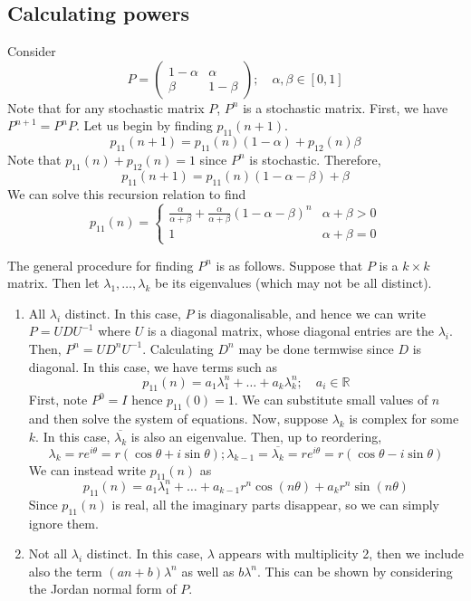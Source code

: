 \subsection{Calculating powers}
\begin{example}
	Consider
	\[
		P = \begin{pmatrix}
			1-\alpha & \alpha \\ \beta & 1-\beta
		\end{pmatrix};\quad \alpha, \beta \in [0,1]
	\]
	Note that for any stochastic matrix \( P \), \( P^n \) is a stochastic matrix.
	First, we have \( P^{n+1} = P^n P \).
	Let us begin by finding \( p_{11}(n+1) \).
	\[
		p_{11}(n+1) = p_{11}(n)(1-\alpha) + p_{12}(n)\beta
	\]
	Note that \( p_{11}(n) + p_{12}(n) = 1 \) since \( P^n \) is stochastic.
	Therefore,
	\[
		p_{11}(n+1) = p_{11}(n)(1-\alpha-\beta) + \beta
	\]
	We can solve this recursion relation to find
	\[
		p_{11}(n) = \begin{cases}
			\frac{\alpha}{\alpha + \beta} + \frac{\alpha}{\alpha + \beta}(1-\alpha-\beta)^n & \alpha + \beta > 0 \\
			1                                                                               & \alpha + \beta = 0\end{cases}
	\]
\end{example}
\noindent The general procedure for finding \( P^n \) is as follows.
Suppose that \( P \) is a \( k \times k \) matrix.
Then let \( \lambda_1, \dots, \lambda_k \) be its eigenvalues (which may not be all distinct).
\begin{enumerate}[(1)]
	\item All \( \lambda_i \) distinct.
	      In this case, \( P \) is diagonalisable, and hence we can write \( P = U D U^{-1} \) where \( U \) is a diagonal matrix, whose diagonal entries are the \( \lambda_i \).
	      Then, \( P^n = U D^n U^{-1} \).
	      Calculating \( D^n \) may be done termwise since \( D \) is diagonal.
	      In this case, we have terms such as
	      \[
		      p_{11}(n) = a_1 \lambda_1^n + \dots + a_k \lambda_k^n; \quad a_i \in \mathbb R
	      \]
	      First, note \( P^0 = I \) hence \( p_{11}(0) = 1 \).
	      We can substitute small values of \( n \) and then solve the system of equations.
	      Now, suppose \( \lambda_k \) is complex for some \( k \).
	      In this case, \( \overline{\lambda_k} \) is also an eigenvalue.
	      Then, up to reordering,
	      \[
		      \lambda_k = re^{i\theta} = r(\cos \theta + i \sin \theta); \lambda_{k-1} = \overline{\lambda_k} = re^{i\theta} = r(\cos \theta - i \sin \theta)
	      \]
	      We can instead write \( p_{11}(n) \) as
	      \[
		      p_{11}(n) = a_1 \lambda_1^n + \dots + a_{k-1} r^n \cos (n\theta) + a_k r^n \sin (n\theta)
	      \]
	      Since \( p_{11}(n) \) is real, all the imaginary parts disappear, so we can simply ignore them.
	\item Not all \( \lambda_i \) distinct.
	      In this case, \( \lambda \) appears with multiplicity 2, then we include also the term \( (an + b) \lambda^n \) as well as \( b \lambda^n \).
	      This can be shown by considering the Jordan normal form of \( P \).
\end{enumerate}
